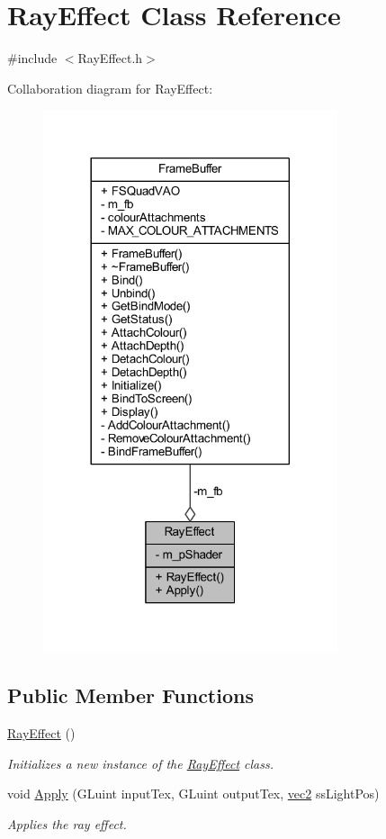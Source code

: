 \hypertarget{class_ray_effect}{}\section{Ray\+Effect Class Reference}
\label{class_ray_effect}


{\ttfamily \#include $<$Ray\+Effect.\+h$>$}



Collaboration diagram for Ray\+Effect\+:\nopagebreak
\begin{figure}[H]
\begin{center}
\leavevmode
\includegraphics[width=245pt]{class_ray_effect__coll__graph}
\end{center}
\end{figure}
\subsection*{Public Member Functions}
\begin{DoxyCompactItemize}
\item 
\hyperlink{class_ray_effect_a4be88c0ce86e43a8229dfa9696795ae7}{Ray\+Effect} ()
\begin{DoxyCompactList}\small\item\em Initializes a new instance of the \hyperlink{class_ray_effect}{Ray\+Effect} class. \end{DoxyCompactList}\item 
void \hyperlink{class_ray_effect_a815b27679273f66bb900578fcfc85f36}{Apply} (G\+Luint input\+Tex, G\+Luint output\+Tex, \hyperlink{_types_8h_a43182e59794291f6ab00e51b160706c2}{vec2} ss\+Light\+Pos)
\begin{DoxyCompactList}\small\item\em Applies the ray effect. \end{DoxyCompactList}\end{DoxyCompactItemize}
